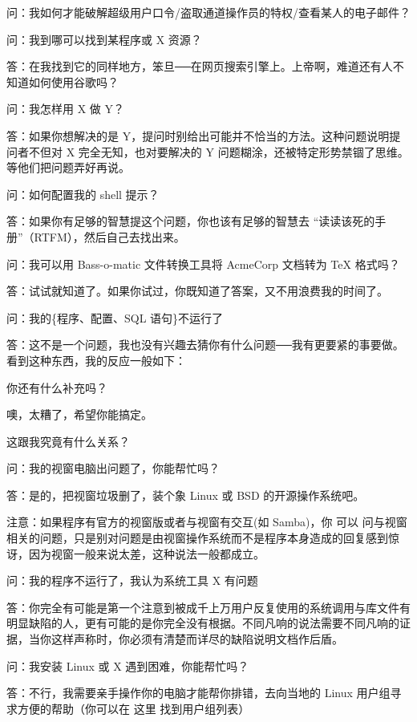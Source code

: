 问：我如何才能破解超级用户口令/盗取通道操作员的特权/查看某人的电子邮件？

问：我到哪可以找到某程序或 X 资源？

答：在我找到它的同样地方，笨旦──在网页搜索引擎上。上帝啊，难道还有人不知道如何使用谷歌吗？

问：我怎样用 X 做 Y？

答：如果你想解决的是 Y，提问时别给出可能并不恰当的方法。这种问题说明提问者不但对 X 完全无知，也对要解决的 Y 问题糊涂，还被特定形势禁锢了思维。等他们把问题弄好再说。

问：如何配置我的 shell 提示？

答：如果你有足够的智慧提这个问题，你也该有足够的智慧去 “读读该死的手册”（RTFM），然后自己去找出来。

问：我可以用 Bass-o-matic 文件转换工具将 AcmeCorp 文档转为 TeX 格式吗？

答：试试就知道了。如果你试过，你既知道了答案，又不用浪费我的时间了。

问：我的\{程序、配置、SQL 语句\}不运行了

答：这不是一个问题，我也没有兴趣去猜你有什么问题──我有更要紧的事要做。看到这种东西，我的反应一般如下：

\begin{compactitem}
\item 你还有什么补充吗？
\item 噢，太糟了，希望你能搞定。
\item 这跟我究竟有什么关系？
\end{compactitem}

问：我的视窗电脑出问题了，你能帮忙吗？

答：是的，把视窗垃圾删了，装个象 Linux 或 BSD 的开源操作系统吧。

注意：如果程序有官方的视窗版或者与视窗有交互(如 Samba)，你 可以 问与视窗相关的问题，只是别对问题是由视窗操作系统而不是程序本身造成的回复感到惊讶，因为视窗一般来说太差，这种说法一般都成立。

问：我的程序不运行了，我认为系统工具 X 有问题

答：你完全有可能是第一个注意到被成千上万用户反复使用的系统调用与库文件有明显缺陷的人，更有可能的是你完全没有根据。不同凡响的说法需要不同凡响的证据，当你这样声称时，你必须有清楚而详尽的缺陷说明文档作后盾。

问：我安装 Linux 或 X 遇到困难，你能帮忙吗？

答：不行，我需要亲手操作你的电脑才能帮你排错，去向当地的 Linux 用户组寻求方便的帮助（你可以在 这里 找到用户组列表）

